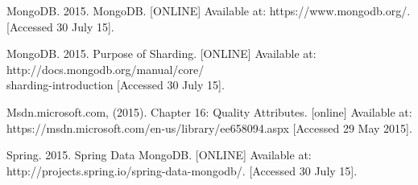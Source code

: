 \begin{thebibliography}{99}
	 MongoDB. 2015. MongoDB. [ONLINE] Available at: https://www.mongodb.org/. [Accessed 30 July 15].

	 MongoDB. 2015. Purpose of Sharding. [ONLINE] 
	Available at: http://docs.mongodb.org/manual/core/ \\sharding-introduction [Accessed 30 July 15].

	 Msdn.microsoft.com, (2015). Chapter 16: Quality Attributes. [online]
	 Available at: https://msdn.microsoft.com/en-us/library/ee658094.aspx [Accessed 29 May 2015].

	 Spring. 2015. Spring Data MongoDB. [ONLINE] Available at: http://projects.spring.io/spring-data-mongodb/. [Accessed 30 July 15].
	
	
\end{thebibliography}